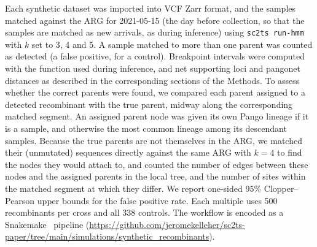 \documentclass[12pt]{article}
\begin{document}
Each synthetic dataset was imported into VCF Zarr format, and the samples
matched against the ARG for 2021-05-15 (the day before collection,
so that the samples are matched as new arrivals, as during inference)
using \texttt{sc2ts run-hmm} with $k$ set to 3, 4 and 5.
A sample matched to more than one parent was counted as detected
(a false positive, for a control).
Breakpoint intervals were computed with the function used during inference,
and net supporting loci and pangonet distances as described in
the corresponding sections of the Methods.
To assess whether the correct parents were found, we compared
each parent assigned to a detected recombinant with the true parent,
midway along the corresponding matched segment.
An assigned parent node was given its own Pango lineage if it is a sample,
and otherwise the most common lineage among its descendant samples.
Because the true parents are not themselves in the ARG,
we matched their (unmutated) sequences directly against the same ARG
with $k=4$ to find the nodes they would attach to,
and counted the number of edges between these nodes and the assigned parents
in the local tree,
and the number of sites within the matched segment at which they differ.
We report one-sided 95\% Clopper--Pearson upper bounds for the false positive rate.
Each multiple uses 500 recombinants per cross and all 338 controls.
The workflow is encoded as a Snakemake~\cite{Koster2012snakemake} pipeline
(\url{https://github.com/jeromekelleher/sc2ts-paper/tree/main/simulations/synthetic_recombinants}).
\end{document}
